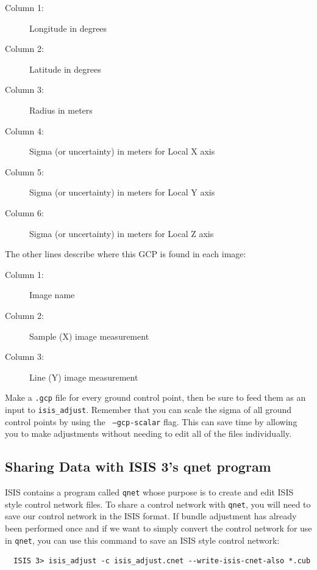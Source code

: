 \begin{myindentpar}{2cm}
\begin{description}
  \item[Column 1:] Longitude in degrees
  \item[Column 2:] Latitude in degrees
  \item[Column 3:] Radius in meters
  \item[Column 4:] Sigma (or uncertainty) in meters for Local X axis
  \item[Column 5:] Sigma (or uncertainty) in meters for Local Y axis
  \item[Column 6:] Sigma (or uncertainty) in meters for Local Z axis
\end{description}
\end{myindentpar}

The other lines describe where this \ac{GCP} is found in each image:

\begin{myindentpar}{2cm}
\begin{description}
  \item[Column 1:] Image name
  \item[Column 2:] Sample (X) image measurement
  \item[Column 3:] Line (Y) image measurement
\end{description}
\end{myindentpar}

Make a {\tt .gcp} file for every ground control point, then be sure
to feed them as an input to {\tt isis\_adjust}. Remember that you
can scale the sigma of all ground control points by using the {\tt
--gcp-scalar} flag. This can save time by allowing you to make
adjustments without needing to edit all of the files individually.

\subsection{Sharing Data with ISIS 3's qnet program}

\ac{ISIS} contains a program called \texttt{qnet} whose purpose is
to create and edit \ac{ISIS} style control network files. To share
a control network with \texttt{qnet}, you will need to save our
control network in the \ac{ISIS} format. If bundle adjustment has
already been performed once and if we want to simply convert the
control network for use in \texttt{qnet}, you can use this command
to save an \ac{ISIS} style control network:

\begin{verbatim}
  ISIS 3> isis_adjust -c isis_adjust.cnet --write-isis-cnet-also *.cub
\end{verbatim}

